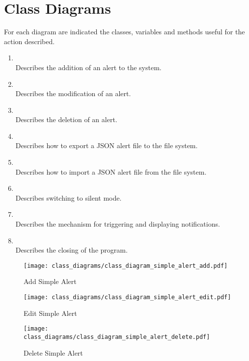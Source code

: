 \chapter{Class Diagrams}\label{ch:class_diagrams}
For each diagram are indicated the classes, variables and methods useful for the action described.\\
\begin{enumerate}
    \item~\\Describes the addition of an alert to the system.
    \item~\\Describes the modification of an alert.
    \item~\\Describes the deletion of an alert.
    \item~\\Describes how to export a JSON alert file to the file system.
    \item~\\Describes how to import a JSON alert file from the file system.
    \item~\\Describes switching to silent mode.
    \item~\\Describes the mechanism for triggering and displaying notifications.
    \item~\\Describes the closing of the program.
\end{enumerate}

\begin{figure}[]
	\centering
    \caption{Add Simple Alert}\label{fig:cls_simple_alert_add}
    \texttt{[image: class\_diagrams/class\_diagram\_simple\_alert\_add.pdf]}
\end{figure}

\begin{figure}[]
	\centering
    \caption{Edit Simple Alert}\label{fig:cls_simple_alert_edit}
    \texttt{[image: class\_diagrams/class\_diagram\_simple\_alert\_edit.pdf]}
\end{figure}

\begin{figure}[]
	\centering
    \caption{Delete Simple Alert}\label{fig:cls_simple_alert_delete}
    \texttt{[image: class\_diagrams/class\_diagram\_simple\_alert\_delete.pdf]}
\end{figure}

